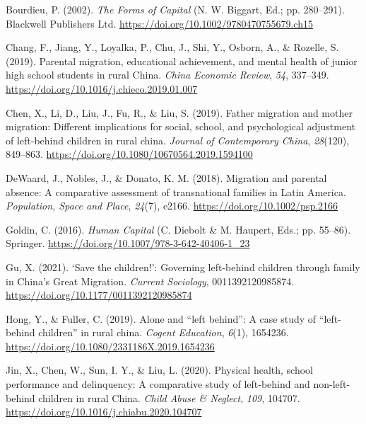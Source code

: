 \documentclass[
  man]{apa7}
\newlength{\cslhangindent}
\newlength{\cslentryspacingunit} %
\newenvironment{CSLReferences}[2] %
 {%
  \setlength{\parindent}{0pt}
  \ifodd #1
  \let\oldpar\par
  \def\par{\hangindent=\cslhangindent\oldpar}
  \fi
  \setlength{\parskip}{#2\cslentryspacingunit}
 }%
 {}
\begin{document}
\begin{CSLReferences}{1}{0}
\leavevmode{}%
Bourdieu, P. (2002). \emph{The Forms of Capital} (N. W. Biggart, Ed.; pp. 280--291). Blackwell Publishers Ltd. \url{https://doi.org/10.1002/9780470755679.ch15}

\leavevmode{}%
Chang, F., Jiang, Y., Loyalka, P., Chu, J., Shi, Y., Osborn, A., \& Rozelle, S. (2019). Parental migration, educational achievement, and mental health of junior high school students in rural China. \emph{China Economic Review}, \emph{54}, 337--349. \url{https://doi.org/10.1016/j.chieco.2019.01.007}

\leavevmode{}%
Chen, X., Li, D., Liu, J., Fu, R., \& Liu, S. (2019). Father migration and mother migration: Different implications for social, school, and psychological adjustment of left-behind children in rural china. \emph{Journal of Contemporary China}, \emph{28}(120), 849--863. \url{https://doi.org/10.1080/10670564.2019.1594100}

\leavevmode{}%
DeWaard, J., Nobles, J., \& Donato, K. M. (2018). Migration and parental absence: A comparative assessment of transnational families in Latin America. \emph{Population, Space and Place}, \emph{24}(7), e2166. \url{https://doi.org/10.1002/psp.2166}

\leavevmode{}%
Goldin, C. (2016). \emph{Human Capital} (C. Diebolt \& M. Haupert, Eds.; pp. 55--86). Springer. \url{https://doi.org/10.1007/978-3-642-40406-1_23}

\leavevmode{}%
Gu, X. (2021). {`}Save the children!{'}: Governing left-behind children through family in China{'}s Great Migration. \emph{Current Sociology}, 0011392120985874. \url{https://doi.org/10.1177/0011392120985874}

\leavevmode{}%
Hong, Y., \& Fuller, C. (2019). Alone and {``}left behind{''}: A case study of {``}left-behind children{''} in rural china. \emph{Cogent Education}, \emph{6}(1), 1654236. \url{https://doi.org/10.1080/2331186X.2019.1654236}

\leavevmode{}%
Jin, X., Chen, W., Sun, I. Y., \& Liu, L. (2020). Physical health, school performance and delinquency: A comparative study of left-behind and non-left-behind children in rural China. \emph{Child Abuse \& Neglect}, \emph{109}, 104707. \url{https://doi.org/10.1016/j.chiabu.2020.104707}


\end{CSLReferences}
\end{document}
